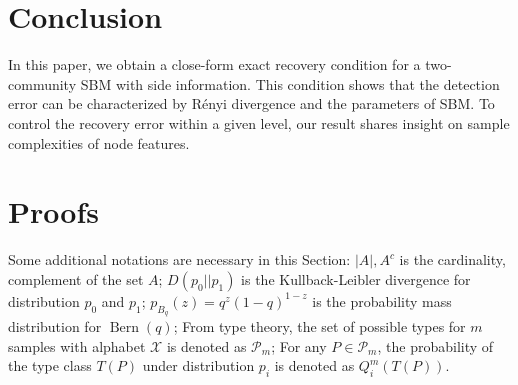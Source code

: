\documentclass[conference]{IEEEtran}
\DeclareMathOperator{\Bern}{Bern}
\begin{document}
\section{Conclusion}\label{s:conclusion}
In this paper, we obtain a close-form exact recovery condition for a two-community SBM with side information. This condition
shows that the detection error can be characterized by Rényi divergence and the parameters of SBM. To control the recovery error within a given level,
our result shares insight on sample complexities of node features.
\section{Proofs}\label{s:proof}
Some additional notations are necessary in this Section: $|A|, A^c$ is the cardinality, complement of the set $A$;
$D(p_0 || p_1)$ is the Kullback-Leibler divergence for distribution $p_0$ and $p_1$;
$p_{B_q}(z) = q^z(1-q)^{1-z}$ is the probability mass distribution for $\Bern(q)$;
From type theory, the set of possible types
for $m$ samples with alphabet $\mathcal{X}$ is denoted as $\mathcal{P}_m$; For any $P\in \mathcal{P}_m$, the probability of the type
class $T(P)$ under distribution $p_i$ is denoted as $Q_i^{m}(T(P))$.
\end{document}
